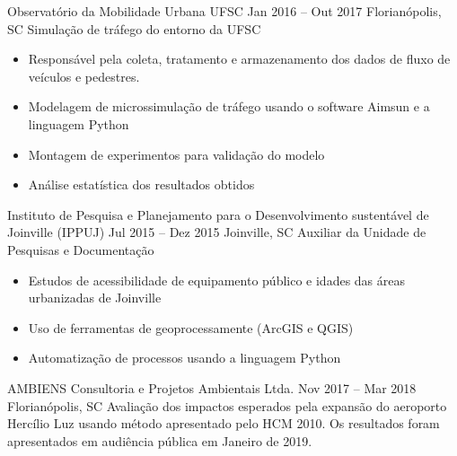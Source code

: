 \documentclass[10pt,a4paper]{altacv}
\begin{document}
\divider

        {Observatório da Mobilidade Urbana UFSC}
        {Jan 2016 -- Out 2017}
        {Florianópolis, SC}
Simulação de tráfego do entorno da UFSC
\vspace{0.2cm}
\begin{itemize}
\item Responsável pela coleta, tratamento e armazenamento dos dados de fluxo
    de veículos e pedestres.
\item Modelagem de microssimulação de tráfego usando o software Aimsun e
    a linguagem Python
\item Montagem de experimentos para validação do modelo
\item Análise estatística dos resultados obtidos
\end{itemize}

\divider

        {Instituto de Pesquisa e Planejamento para o Desenvolvimento
         sustentável de Joinville (IPPUJ)}
        {Jul 2015 -- Dez 2015}
        {Joinville, SC}
Auxiliar da Unidade de Pesquisas e Documentação
\vspace{0.2cm}
\begin{itemize}
    \item Estudos de acessibilidade de equipamento público
        e idades das áreas urbanizadas de Joinville
    \item Uso de ferramentas de geoprocessamente (ArcGIS e QGIS)
    \item Automatização de processos usando a linguagem Python
\end{itemize}


        {AMBIENS Consultoria e Projetos Ambientais Ltda.}
        {Nov 2017 -- Mar 2018}
        {Florianópolis, SC}
Avaliação dos impactos esperados pela expansão do aeroporto Hercílio Luz usando
método apresentado pelo HCM 2010.
Os resultados foram apresentados em audiência pública em Janeiro de 2019.

\clearpage








\nocite{*}

\printbibliography[heading=pubtype,
                   title={\printinfo{\faFileTextO}{Artigos em revistas}},
                   type=article]
\end{document}
